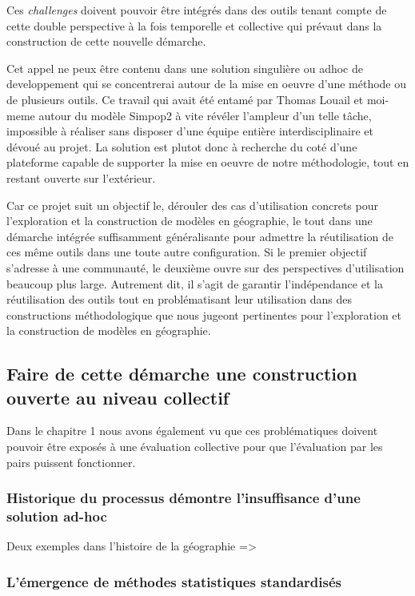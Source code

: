 Ces \textit{challenges} doivent pouvoir être intégrés dans des outils tenant compte de cette double perspective à la fois temporelle et collective qui prévaut dans la construction de cette nouvelle démarche.

Cet appel ne peux être contenu dans une solution singulière ou adhoc de developpement qui se concentrerai autour de la mise en oeuvre d'une méthode ou de plusieurs outils. Ce travail qui avait été entamé par Thomas Louail et moi-meme autour du modèle Simpop2 à vite révéler l'ampleur d'un telle tâche, impossible à réaliser sans disposer d'une équipe entière interdisciplinaire et dévoué au projet. La solution est plutot donc à recherche du coté d'une plateforme capable de supporter la mise en oeuvre de notre méthodologie, tout en restant ouverte sur l'extérieur. 

Car ce projet suit un objectif 
le, dérouler des cas d'utilisation concrets pour l'exploration et la construction de modèles en géographie, le tout dans une démarche intégrée suffisamment généralisante pour admettre la réutilisation de ces même outils dans une toute autre configuration. Si le premier objectif s'adresse à une communauté, le deuxième ouvre sur des perspectives d'utilisation beaucoup plus large. Autrement dit, il s'agit de garantir l'indépendance et la réutilisation des outils tout en problématisant leur utilisation dans des constructions méthodologique que nous jugeont pertinentes pour l'exploration et la construction de modèles en géographie.

\subsection{Faire de cette démarche une construction ouverte au niveau collectif}

Dans le chapitre 1 nous avons également vu que ces problématiques doivent pouvoir être exposés à une évaluation collective pour que l'évaluation par les pairs puissent fonctionner.

\subsubsection{Historique du processus démontre l'insuffisance d'une solution ad-hoc}

Deux exemples dans l'histoire de la géographie =>

\subsubsection{L'émergence de méthodes statistiques standardisés }

